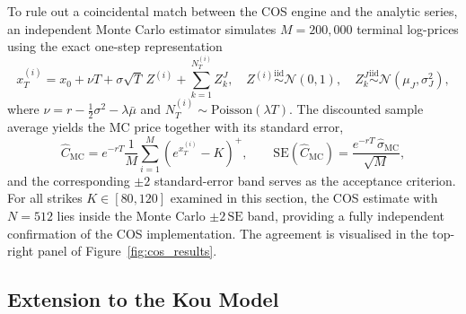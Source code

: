 \documentclass[12pt]{article}
\begin{document}
To rule out a coincidental match between the COS engine and the
analytic series, an independent Monte Carlo estimator simulates
$M = 200{,}000$ terminal log-prices using the exact one-step
representation
\begin{equation}
  x_T^{(i)} = x_0 + \nu T + \sigma\sqrt{T}\,Z^{(i)}
              + \sum_{k=1}^{N_T^{(i)}} Z_k^J,
  \quad Z^{(i)}\overset{\text{iid}}{\sim}\mathcal{N}(0,1),
  \quad Z_k^J\overset{\text{iid}}{\sim}\mathcal{N}(\mu_J,\sigma_J^2),
\end{equation}
where $\nu = r - \tfrac{1}{2}\sigma^2 - \lambda\bar{\mu}$ and
$N_T^{(i)} \sim \mathrm{Poisson}(\lambda T)$. The discounted sample
average yields the MC price together with its standard error,
\begin{equation}
  \hat C_{\mathrm{MC}} = e^{-rT}\frac{1}{M}\sum_{i=1}^M(e^{x_T^{(i)}}-K)^{+},
  \qquad
  \mathrm{SE}(\hat C_{\mathrm{MC}}) = \frac{e^{-rT}\,\hat\sigma_{\mathrm{MC}}}{\sqrt{M}},
\end{equation}
and the corresponding $\pm 2$ standard-error band serves as the
acceptance criterion. For all strikes $K \in [80, 120]$ examined in
this section, the COS estimate with $N = 512$ lies inside the
Monte Carlo $\pm 2\,\mathrm{SE}$ band, providing a fully independent
confirmation of the COS implementation. The agreement is visualised
in the top-right panel of Figure~\ref{fig:cos_results}.

\subsection*{Extension to the Kou Model}
\end{document}
